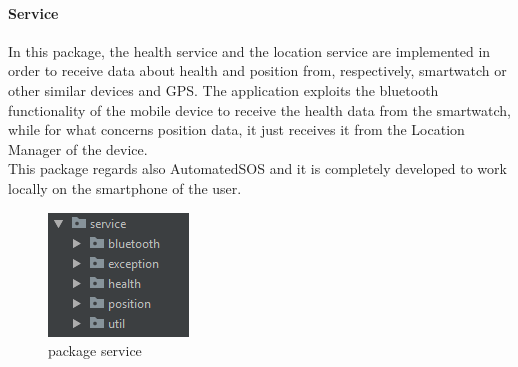 \paragraph{Service}
In this package, the health service and the location service are implemented in order to receive data about health and position 
from, respectively, smartwatch or other similar devices and GPS. 
The application exploits the bluetooth functionality of the mobile device to receive the health data from the smartwatch, while for what 
concerns position data, it just receives it from the Location Manager of the device.\\

This package regards also AutomatedSOS and it is completely developed to work locally on the smartphone of the user. 

\begin{figure}[H]
\includegraphics[width=0.6\linewidth]{images/Service.png}
\centering
\caption{ package service }
\label{fig:pkgsharedata}
\end{figure}

